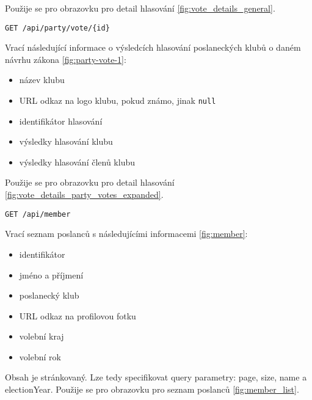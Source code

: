 \noindent Použije se pro obrazovku pro detail hlasování \ref{fig:vote_details_general}.

\vspace{10px}

\begin{lstlisting}[caption={HTTP dotaz pro výsledky hlasování klubů}, label={lst:endpoint-party-votes}] 
GET /api/party/vote/{id}
\end{lstlisting}

\noindent Vrací následující informace o výsledcích hlasování poslaneckých klubů o daném návrhu zákona \ref{fig:party-vote-1}:

\begin{itemize}
	\item název klubu
	\item URL odkaz na logo klubu, pokud známo, jinak \lstinline|null|
	\item identifikátor hlasování
	\item výsledky hlasování klubu
	\item výsledky hlasování členů klubu
\end{itemize}

\noindent Použije se pro obrazovku pro detail hlasování \ref{fig:vote_details_party_votes_expanded}.

\vspace{10px}

\begin{lstlisting}[caption={HTTP dotaz pro seznam poslanců}, label={lst:endpoint-members}] 
GET /api/member
\end{lstlisting}

\noindent Vrací seznam poslanců s následujícími informacemi \ref{fig:member}:

\begin{itemize}
	\item identifikátor
	\item jméno a příjmení
	\item poslanecký klub
	\item URL odkaz na profilovou fotku
	\item volební kraj
	\item volební rok
\end{itemize}

\noindent Obsah je stránkovaný. Lze tedy specifikovat query parametry: page, size, name a electionYear. Použije se pro obrazovku pro seznam poslanců \ref{fig:member_list}.

\vspace{10px}

